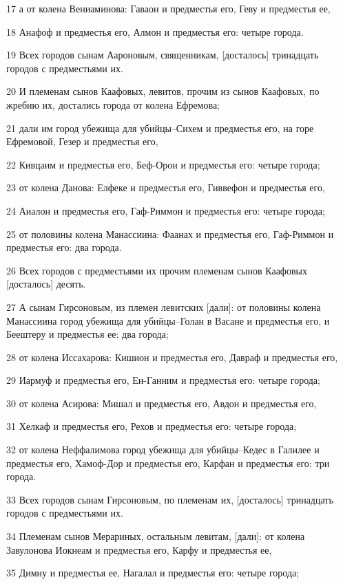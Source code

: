\par 17 а от колена Вениаминова: Гаваон и предместья его, Геву и предместья ее,
\par 18 Анафоф и предместья его, Алмон и предместья его: четыре города.
\par 19 Всех городов сынам Аароновым, священникам, [досталось] тринадцать городов с предместьями их.
\par 20 И племенам сынов Каафовых, левитов, прочим из сынов Каафовых, по жребию их, достались города от колена Ефремова;
\par 21 дали им город убежища для убийцы--Сихем и предместья его, на горе Ефремовой, Гезер и предместья его,
\par 22 Кивцаим и предместья его, Беф-Орон и предместья его: четыре города;
\par 23 от колена Данова: Елфеке и предместья его, Гиввефон и предместья его,
\par 24 Аиалон и предместья его, Гаф-Риммон и предместья его: четыре города;
\par 25 от половины колена Манассиина: Фаанах и предместья его, Гаф-Риммон и предместья его: два города.
\par 26 Всех городов с предместьями их прочим племенам сынов Каафовых [досталось] десять.
\par 27 А сынам Гирсоновым, из племен левитских [дали]: от половины колена Манассиина город убежища для убийцы--Голан в Васане и предместья его, и Беештеру и предместья ее: два города;
\par 28 от колена Иссахарова: Кишион и предместья его, Давраф и предместья его,
\par 29 Иармуф и предместья его, Ен-Ганним и предместья его: четыре города;
\par 30 от колена Асирова: Мишал и предместья его, Авдон и предместья его,
\par 31 Хелкаф и предместья его, Рехов и предместья его: четыре города;
\par 32 от колена Неффалимова город убежища для убийцы--Кедес в Галилее и предместья его, Хамоф-Дор и предместья его, Карфан и предместья его: три города.
\par 33 Всех городов сынам Гирсоновым, по племенам их, [досталось] тринадцать городов с предместьями их.
\par 34 Племенам сынов Мерариных, остальным левитам, [дали]: от колена Завулонова Иокнеам и предместья его, Карфу и предместья ее,
\par 35 Димну и предместья ее, Нагалал и предместья его: четыре города;
